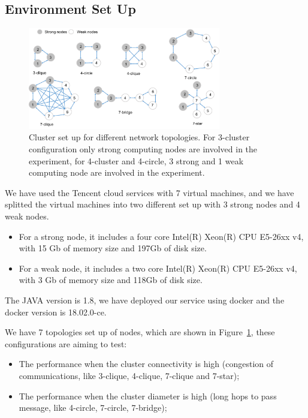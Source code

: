 \subsection {Environment Set Up}

\begin{figure}[!ht]
\begin{center}
\includegraphics[width=0.75\textwidth]{figures/cluster_set_up.pdf}
    \caption{
        Cluster set up for different network topologies. For 3-cluster configuration only strong computing nodes are involved in the experiment, for 4-cluster and 4-circle, 3 strong and 1 weak computing node are involved in the experiment.
     }
\label{cluster_set_up}
\end{center}
\end{figure}

We have used the Tencent cloud services with 7 virtual machines, and we have splitted the virtual machines into two different set up with 3 strong nodes and 4 weak nodes. 

\begin{itemize}
    \item For a strong node, it includes a four core Intel(R) Xeon(R) CPU E5-26xx v4, with 15 Gb of memory size and 197Gb of disk size. 
    \item For a weak node, it includes a two core Intel(R) Xeon(R) CPU E5-26xx v4, with 3 Gb of memory size and 118Gb of disk size. 
\end{itemize}
The JAVA version is 1.8, we have deployed our service using docker and the docker version is 18.02.0-ce.   

We have 7 topologies set up of nodes, which are shown in Figure~\ref{cluster_set_up}, these configurations are aiming to test: 
\begin{itemize}
    \item The performance when the cluster connectivity is high (congestion of communications, like 3-clique, 4-clique, 7-clique and 7-star);
    \item The performance when the cluster diameter is high (long hops to pass message, like 4-circle, 7-circle, 7-bridge);
\end{itemize}

